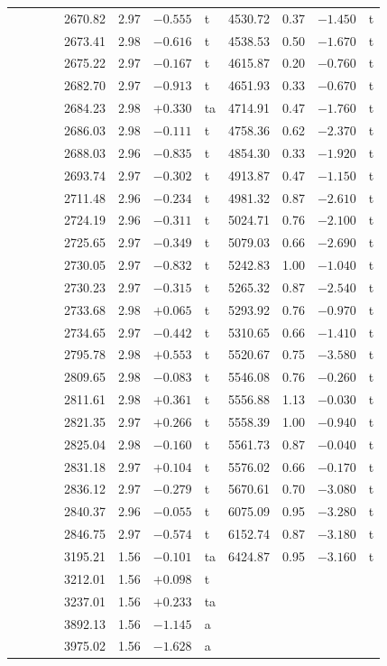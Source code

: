 \begin{tabular}{rrrl@{\hspace{10pt}}rrrl@{\hspace{10pt}}rrrl}
 & & &  & 2670.82 & 2.97 & $-0.555$ & t & 4530.72 & 0.37 & $-1.450$ & t \\
 & & &  & 2673.41 & 2.98 & $-0.616$ & t & 4538.53 & 0.50 & $-1.670$ & t \\
 & & &  & 2675.22 & 2.97 & $-0.167$ & t & 4615.87 & 0.20 & $-0.760$ & t \\
 & & &  & 2682.70 & 2.97 & $-0.913$ & t & 4651.93 & 0.33 & $-0.670$ & t \\
 & & &  & 2684.23 & 2.98 & $+0.330$ & ta & 4714.91 & 0.47 & $-1.760$ & t \\
 & & &  & 2686.03 & 2.98 & $-0.111$ & t & 4758.36 & 0.62 & $-2.370$ & t \\
 & & &  & 2688.03 & 2.96 & $-0.835$ & t & 4854.30 & 0.33 & $-1.920$ & t \\
 & & &  & 2693.74 & 2.97 & $-0.302$ & t & 4913.87 & 0.47 & $-1.150$ & t \\
 & & &  & 2711.48 & 2.96 & $-0.234$ & t & 4981.32 & 0.87 & $-2.610$ & t \\
 & & &  & 2724.19 & 2.96 & $-0.311$ & t & 5024.71 & 0.76 & $-2.100$ & t \\
 & & &  & 2725.65 & 2.97 & $-0.349$ & t & 5079.03 & 0.66 & $-2.690$ & t \\
 & & &  & 2730.05 & 2.97 & $-0.832$ & t & 5242.83 & 1.00 & $-1.040$ & t \\
 & & &  & 2730.23 & 2.97 & $-0.315$ & t & 5265.32 & 0.87 & $-2.540$ & t \\
 & & &  & 2733.68 & 2.98 & $+0.065$ & t & 5293.92 & 0.76 & $-0.970$ & t \\
 & & &  & 2734.65 & 2.97 & $-0.442$ & t & 5310.65 & 0.66 & $-1.410$ & t \\
 & & &  & 2795.78 & 2.98 & $+0.553$ & t & 5520.67 & 0.75 & $-3.580$ & t \\
 & & &  & 2809.65 & 2.98 & $-0.083$ & t & 5546.08 & 0.76 & $-0.260$ & t \\
 & & &  & 2811.61 & 2.98 & $+0.361$ & t & 5556.88 & 1.13 & $-0.030$ & t \\
 & & &  & 2821.35 & 2.97 & $+0.266$ & t & 5558.39 & 1.00 & $-0.940$ & t \\
 & & &  & 2825.04 & 2.98 & $-0.160$ & t & 5561.73 & 0.87 & $-0.040$ & t \\
 & & &  & 2831.18 & 2.97 & $+0.104$ & t & 5576.02 & 0.66 & $-0.170$ & t \\
 & & &  & 2836.12 & 2.97 & $-0.279$ & t & 5670.61 & 0.70 & $-3.080$ & t \\
 & & &  & 2840.37 & 2.96 & $-0.055$ & t & 6075.09 & 0.95 & $-3.280$ & t \\
 & & &  & 2846.75 & 2.97 & $-0.574$ & t & 6152.74 & 0.87 & $-3.180$ & t \\
 & & &  & 3195.21 & 1.56 & $-0.101$ & ta & 6424.87 & 0.95 & $-3.160$ & t \\
 & & &  & 3212.01 & 1.56 & $+0.098$ & t &  & & &  \\
 & & &  & 3237.01 & 1.56 & $+0.233$ & ta &  & & &  \\
 & & &  & 3892.13 & 1.56 & $-1.145$ & a &  & & &  \\
 & & &  & 3975.02 & 1.56 & $-1.628$ & a &  & & &  \\
\bottomrule
\end{tabular}
